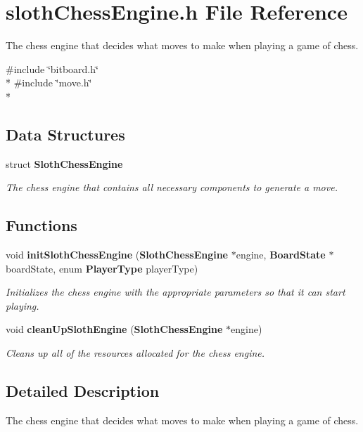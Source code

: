 \section{sloth\+Chess\+Engine.\+h File Reference}
\label{sloth_chess_engine_8h}


The chess engine that decides what moves to make when playing a game of chess.  


{\ttfamily \#include \char`\"{}bitboard.\+h\char`\"{}}\\*
{\ttfamily \#include \char`\"{}move.\+h\char`\"{}}\\*
\subsection*{Data Structures}
\begin{DoxyCompactItemize}
\item 
struct {\bf Sloth\+Chess\+Engine}
\begin{DoxyCompactList}\small\item\em The chess engine that contains all necessary components to generate a move. \end{DoxyCompactList}\end{DoxyCompactItemize}
\subsection*{Functions}
\begin{DoxyCompactItemize}
\item 
void {\bf init\+Sloth\+Chess\+Engine} ({\bf Sloth\+Chess\+Engine} $\ast$engine, {\bf Board\+State} $\ast$board\+State, enum {\bf Player\+Type} player\+Type)
\begin{DoxyCompactList}\small\item\em Initializes the chess engine with the appropriate parameters so that it can start playing. \end{DoxyCompactList}\item 
void {\bf clean\+Up\+Sloth\+Engine} ({\bf Sloth\+Chess\+Engine} $\ast$engine)
\begin{DoxyCompactList}\small\item\em Cleans up all of the resources allocated for the chess engine. \end{DoxyCompactList}\end{DoxyCompactItemize}


\subsection{Detailed Description}
The chess engine that decides what moves to make when playing a game of chess. 

